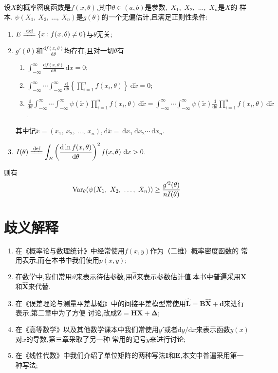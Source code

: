 \documentclass[cn,10pt,citestyle=gb7714-2015,bibstyle=gb7714-2015]{elegantbook}
\newcommand{\md}{\ \mathrm{d}}
\newcommand{\Var}{\textup{Var}}
\begin{document}
\begin{theorem}
  设$X$的概率密度函数是$f(x,\theta)$,其中$\theta\in(a,b)$是参数,\ $X_1$,\ $X_2$,\ $\ldots$,\ $X_n$是$X$的
  样本. $\psi(X_1,\ X_2,\ \ldots,\ X_n)$是$g(\theta)$的一个无偏估计,且满足正则性条件:
  \begin{enumerate}
    \item $\displaystyle E\xlongequal{\textup{def}}\{x:f(x,\theta)\neq 0\}$与$\theta$无关;
    \item $\displaystyle g'(\theta)$和$\displaystyle \frac{\mathrm{d}f(x,\theta)}{\mathrm{d}\theta}$均存在,且对一切$\theta$有
    \begin{enumerate}
      \item $\displaystyle \int_{-\infty}^\infty \frac{\mathrm{d}f(x,\theta)}{\mathrm{d}\theta}\md x=0$;
      \item $\displaystyle \int_{-\infty}^\infty \cdots\int_{-\infty}^\infty\frac{\mathrm{d}}{\mathrm{d}\theta}\left\{\prod_{i=1}^nf(x_i,\theta)\right\}\md\widetilde{x}=0$;
      \item $\displaystyle \frac{\mathrm{d}}{\mathrm{d}\theta}\int_{-\infty}^\infty \cdots\int_{-\infty}^\infty\psi(\widetilde{x})\prod_{i=1}^nf(x_i,\theta)\md\widetilde{x}=\int_{-\infty}^\infty \cdots\int_{-\infty}^\infty\psi(\widetilde{x})\frac{\mathrm{d}}{\mathrm{d}\theta}\prod_{i=1}^nf(x_i,\theta)\md\widetilde{x}$.
    \end{enumerate}
    其中记$\widetilde{x}=(x_1,\ x_2,\ \ldots,\ x_n)$,$\md\widetilde{x}=\md x_1\!\md x_2\cdots\!\md x_n$.
    \item $\displaystyle I(\theta)\xlongequal{\textup{def}}\int_E\left(\frac{\mathrm{d}\ln f(x,\theta)}{\mathrm{d}\theta}\right)^2f(x,\theta)\md x>0$.
  \end{enumerate}
  则有
  \begin{equation}
    \Var_\theta(\psi(X_1,\ X_2,\ \ldots,\ X_n))\geq\frac{g'^2(\theta)}{nI(\theta)}
  \end{equation}
\end{theorem}
\chapter{歧义解释}
\begin{enumerate}
  \item 在《概率论与数理统计》中经常使用$f(x,y)$作为（二维）概率密度函数的
  常用表示,而在本书中我们使用$p(x,y)$;
  \item 在数学中,我们常用$\vartheta$来表示待估参数,用$\hat{\vartheta}$来表示参数估计值.本书中普遍采用$\bm{X}$和$\hat{\bm{X}}$来代替.
  \item 在《误差理论与测量平差基础》中的间接平差模型常使用$\hat{\bm{L}}=\bm{B}\hat{\bm{X}}+\bm{d}$来进行表示,第二章中为了方便
  讨论,改成$\bm{Z}=\bm{H}\bm{X}+\bm{\Delta}$;
  \item 在《高等数学》以及其他数学课本中我们常使用$y'$或者$\mathrm{d}y/\mathrm{d}x$来表示函数$y(x)$对$x$的导数,第三章采取了另一种
  常用的记号$\dot{y}$来进行讨论;
  \item 在《线性代数》中我们介绍了单位矩阵的两种写法$\bm{I}$和$\bm{E}$,本文中普遍采用第一种写法;
\end{enumerate}
\end{document}
